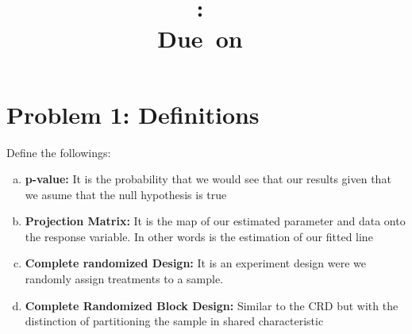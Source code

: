 \documentclass{article}
\title{
	\vspace{2in}
	\textmd{\textbf{\hmwkClass:\ \hmwkTitle}}\\
	\normalsize\vspace{0.1in}\small{Due\ on\ \hmwkDueDate}\\
	\vspace{0.1in}\large{\textit{\hmwkClassInstructor}}
	\vspace{3in}
}
\author{\hmwkAuthorName}
\date{}
\begin{document}
\maketitle
\pagebreak

\section*{Problem 1: Definitions}
Define the followings:
\begin{enumerate}[(a)]
	\item \textbf{p-value:} It is the probability that we would see that our results given that we asume that the null hypothesis is true
	\item \textbf{Projection Matrix:} It is the map of our estimated parameter and data onto the response variable. In other words is the
	      estimation of our fitted line
	\item \textbf{Complete randomized Design:} It is an experiment design were we randomly assign treatments to a sample.
	\item \textbf{Complete Randomized Block Design:} Similar to the CRD but with the distinction of partitioning the sample in shared characteristic

\end{enumerate}
\end{document}

